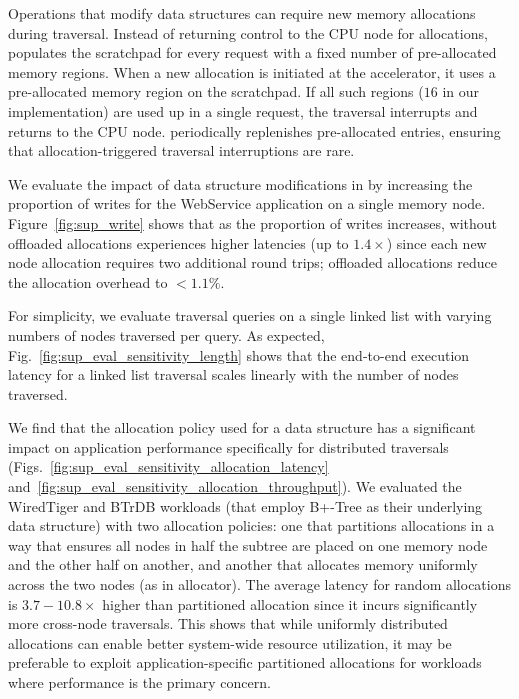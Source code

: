  Operations that modify data structures can require new memory allocations during traversal. Instead of returning control to the CPU node for allocations, \pulse populates the scratchpad for every request with a fixed number of pre-allocated memory regions. When a new allocation is initiated at the \pulse accelerator, it uses a pre-allocated memory region on the scratchpad. If all such regions ($16$ in our implementation) are used up in a single request, the traversal interrupts and returns to the CPU node. \pulse periodically replenishes pre-allocated entries, ensuring that allocation-triggered traversal interruptions are rare.

We evaluate the impact of data structure modifications in \pulse by increasing the proportion of writes for the WebService application on a single memory node. Figure~\ref{fig:sup_write} shows that as the proportion of writes increases, \pulse without offloaded allocations experiences higher latencies (up to $1.4\times$) since each new node allocation requires two additional round trips; offloaded allocations reduce the allocation overhead to $<1.1\%$.

 For simplicity, we evaluate traversal queries on a single linked list with varying numbers of nodes traversed per query. As expected, Fig.~\ref{fig:sup_eval_sensitivity_length} shows that the end-to-end execution latency for a linked list traversal scales linearly with the number of nodes traversed.

 We find that the allocation policy used for a data structure has a significant impact on application performance specifically for distributed traversals (Figs.~\ref{fig:sup_eval_sensitivity_allocation_latency} and~\ref{fig:sup_eval_sensitivity_allocation_throughput}). We evaluated the WiredTiger and BTrDB workloads (that employ B+-Tree as their underlying data structure) with two allocation policies: one that partitions allocations in a way that ensures all nodes in half the subtree are placed on one memory node and the other half on another, and another that allocates memory uniformly across the two nodes (as in  allocator). The average latency for random allocations is $3.7-10.8\times$ higher than partitioned allocation since it incurs significantly more cross-node traversals. This shows that while uniformly distributed allocations can enable better system-wide resource utilization, it may be preferable to exploit application-specific partitioned allocations for workloads where performance is the primary concern. 

